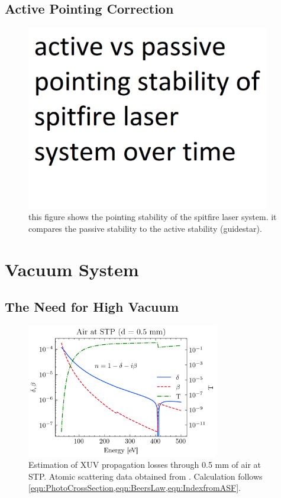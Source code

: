 \subsection{Active Pointing Correction}

\begin{figure}
	\centering
	\includegraphics[width=0.95\textwidth]{figures/chap2/guidestar_data.png}
	\caption{this figure shows the pointing stability of the spitfire laser system. it compares the passive stability to the active stability (guidestar).}
	\label{fig:guidestar_stability}
\end{figure}

\section{Vacuum System}

\subsection{The Need for High Vacuum}

\begin{figure}
	\centering
	\includegraphics[width=0.75\textwidth]{figures/chap2/AirAbs.png}
	\caption{Estimation of XUV propagation losses through 0.5 mm of air at STP. Atomic scattering data obtained from \cite{gulliksonCXROXRayInteractions,henkeXRayInteractionsPhotoabsorption1993}. Calculation follows \cref{eqn:PhotoCrossSection,eqn:BeersLaw,eqn:IndexfromASF}.}
	\label{fig:AirAbs}
\end{figure}

